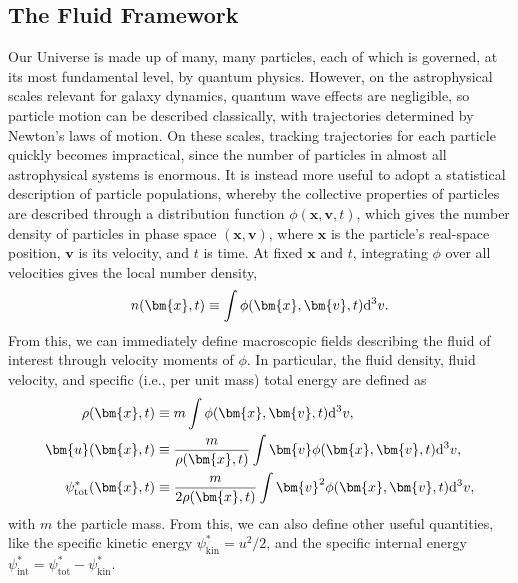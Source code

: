 \documentclass[12pt,twoside]{extreport}
\newcommand{\mVector}[1]{\bm{#1}} %
\newcommand{\mdd}[1]{\mathrm{d} #1}
\newcommand{\ie}{i.e.,\xspace} %
\begin{document}
\subsection{The Fluid Framework}
\label{sec:modelling:fluid}

Our Universe is made up of many, many particles, each of which is governed, at its most fundamental level, by quantum physics. However, on the astrophysical scales relevant for galaxy dynamics, quantum wave effects are negligible, so particle motion can be described classically, with trajectories determined by Newton's laws of motion. On these scales, tracking trajectories for each particle quickly becomes impractical, since the number of particles in almost all astrophysical systems is enormous. It is instead more useful to adopt a statistical description of particle populations, whereby the collective properties of particles are described through a distribution function $\phi(\mVector{x}, \mVector{v}, t)$, which gives the number density of particles in phase space $(\mVector{x}, \mVector{v})$, where $\mVector{x}$ is the particle's real-space position, $\mVector{v}$ is its velocity, and $t$ is time. At fixed $\mVector{x}$ and $t$, integrating $\phi$ over all velocities gives the local number density,
\begin{align}
    n(\mVector{x}, t)
        \equiv \int \phi(\mVector{x}, \mVector{v}, t)  \mdd^3v .
\end{align}
From this, we can immediately define macroscopic fields describing the fluid of interest through velocity moments of $\phi$. In particular, the fluid density, fluid velocity, and specific (\ie per unit mass) total energy are defined as
\begin{align}
    \rho(\mVector{x}, t)
        &\equiv m \int \phi(\mVector{x}, \mVector{v}, t)  \mdd^3v
        , \\
    \mVector{u}(\mVector{x}, t)
        &\equiv \frac{m}{\rho(\mVector{x}, t)} \int \mVector{v} \phi(\mVector{x}, \mVector{v}, t)  \mdd^3v
        , \\
    \psi^{*}_\mathrm{tot}(\mVector{x}, t)
        &\equiv \frac{m}{2\rho(\mVector{x}, t)}\int \mVector{v}^{ 2} \phi(\mVector{x}, \mVector{v}, t)  \mdd^3v
        ,
\end{align}
with $m$ the particle mass. From this, we can also define other useful quantities, like the specific kinetic energy $\psi^{*}_\mathrm{kin} = u^2 / 2$, and the specific internal energy $\psi^{*}_\mathrm{int} = \psi^{*}_\mathrm{tot} - \psi^{*}_\mathrm{kin}$.
\end{document}
